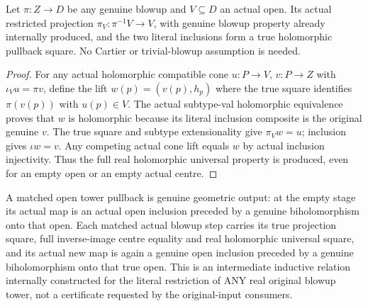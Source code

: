\begin{theorem}
\label{hir:submersion-global-trace-open-universal}
\leanok
{}

Let $\pi:Z\to D$ be any genuine blowup and $V\subseteq D$ an actual open. Its actual restricted projection $\pi_V:\pi^{-1}V\to V$, with genuine blowup property already internally produced, and the two literal inclusions form a true holomorphic pullback square. No Cartier or trivial-blowup assumption is needed.
\end{theorem}
\begin{proof}
For any actual holomorphic compatible cone $u:P\to V$, $v:P\to Z$ with $\iota_Vu=\pi v$, define the lift $w(p)=(v(p),h_p)$ where the true square identifies $\pi(v(p))$ with $u(p)\in V$. The actual subtype-val holomorphic equivalence proves that $w$ is holomorphic because its literal inclusion composite is the original genuine $v$. The true square and subtype extensionality give $\pi_Vw=u$; inclusion gives $\iota w=v$. Any competing actual cone lift equals $w$ by actual inclusion injectivity. Thus the full real holomorphic universal property is produced, even for an empty open or an empty actual centre.
\end{proof}

\begin{definition}
\label{hir:submersion-global-trace-matched-open-definition}
\leanok
{}

A matched open tower pullback is genuine geometric output: at the empty stage its actual map is an actual open inclusion preceded by a genuine biholomorphism onto that open. Each matched actual blowup step carries its true projection square, full inverse-image centre equality and real holomorphic universal square, and its actual new map is again a genuine open inclusion preceded by a genuine biholomorphism onto that true open. This is an intermediate inductive relation internally constructed for the literal restriction of ANY real original blowup tower, not a certificate requested by the original-input consumers.
\end{definition}

